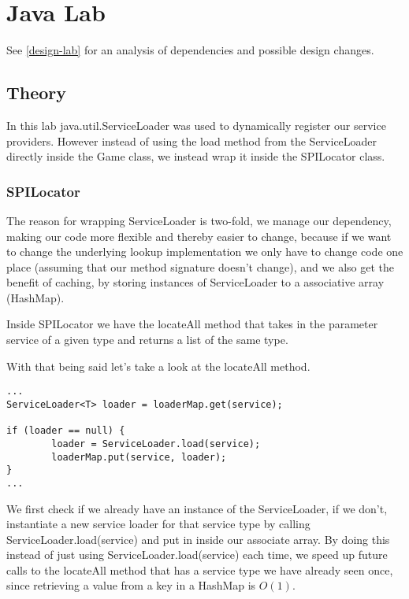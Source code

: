 
\section{Java Lab}

See \ref{design-lab} for an analysis of dependencies and possible design
changes.

\subsection{Theory}
In this lab java.util.ServiceLoader was used to dynamically register our
service providers. However instead of using the load method from the
ServiceLoader directly inside the Game class, we instead wrap it inside the SPILocator class.

\subsubsection{SPILocator}
The reason for wrapping ServiceLoader is two-fold, we manage our dependency, making our code more
flexible and thereby easier to change, because if we want to change the
underlying lookup implementation we only have to change code one place (assuming
that our method signature doesn't change), and we also get the benefit of caching,
by storing instances of ServiceLoader to a associative array (HashMap).

Inside SPILocator we have the locateAll method that takes in the parameter service of
a given type and returns a list of the same type.

With that being said let's take a look at the locateAll method.

\begin{verbatim}
...
ServiceLoader<T> loader = loaderMap.get(service);

if (loader == null) {
        loader = ServiceLoader.load(service);
        loaderMap.put(service, loader);
}
...
\end{verbatim}

We first check if we already have an instance of the ServiceLoader, if
we don't, instantiate a new service loader for that service type by calling
ServiceLoader.load(service) and put in inside our associate array.
By doing this instead of just using ServiceLoader.load(service) each time, we
speed up future calls to the locateAll method that has a service type we have
already seen once, since retrieving a value from a key in a HashMap is $O(1)$.


